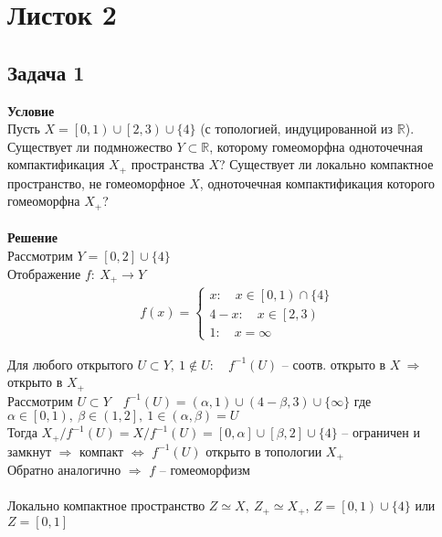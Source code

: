 \newpage
	\section{Листок 2}
		\subsection*{Задача 1}
		\textbf{Условие}\\
		Пусть $X = \left[0, 1\right)\cup \left[2, 3\right)\cup\{4\}$ (с топологией, индуцированной из $\mathbb{R}$). Существует ли подмножество $Y\subset \mathbb{R}$, которому гомеоморфна одноточечная компактификация $X_{+}$ пространства $X$? Существует ли локально компактное пространство, не гомеоморфное $X$, одноточечная компактификация которого гомеоморфна $X_{+}$?\\
		\\
		\textbf{Решение}\\
		Рассмотрим $Y = [0,2] \cup \{4\}$\\
		Отображение $f:\ X_{+} \to Y$\\
		\begin{gather*}
			f(x) = 
			\begin{cases}
				x:\quad  x \in \left[0,1\right) \cap \{4\}\\
				4 - x:\quad  x \in \left[2,3\right)\\
				1:\quad  x = \infty
			\end{cases}
		\end{gather*}
		\begin{comment}
		f^{-1}(x) = 
		\begin{cases}
		x:\quad  x \in \left[0,1\right) \cap \{4\}\\
		4 - x:\quad  x \in \left(1,2\right]\\
		\infty:\quad  x = 1
		\end{cases}
		\end{comment}	
		Для любого открытого $U \subset Y,\ 1 \notin U:\quad f^{-1}(U)$ -- соотв. открыто в $X\ \Rightarrow$ открыто в $X_{+}$\\
		Рассмотрим $U \subset Y\quad f^{-1}(U) = (\alpha, 1) \cup (4-\beta, 3) \cup \{\infty\}$ где $\alpha \in \left[0,1\right),\ \beta\in \left(1,2\right],\ 1\in (\alpha, \beta) = U$\\
		Тогда $X_{+}\slash f^{-1}(U) = X\slash f^{-1}(U) = [0, \alpha] \cup [\beta, 2] \cup \{4\}$ -- ограничен и замкнут $\Rightarrow$ компакт $\Leftrightarrow$ $f^{-1}(U)$ открыто в топологии $X_{+}$\\
		Обратно аналогично $\Rightarrow$ $f$ -- гомеоморфизм\\
		\\
		Локально компактное пространство $Z \simeq X,\ Z_{+} \simeq X_{+}$, $Z = \left[0,1\right) \cup \{4\}$ или $Z = [0,1]$\\	
		\\\\
		
